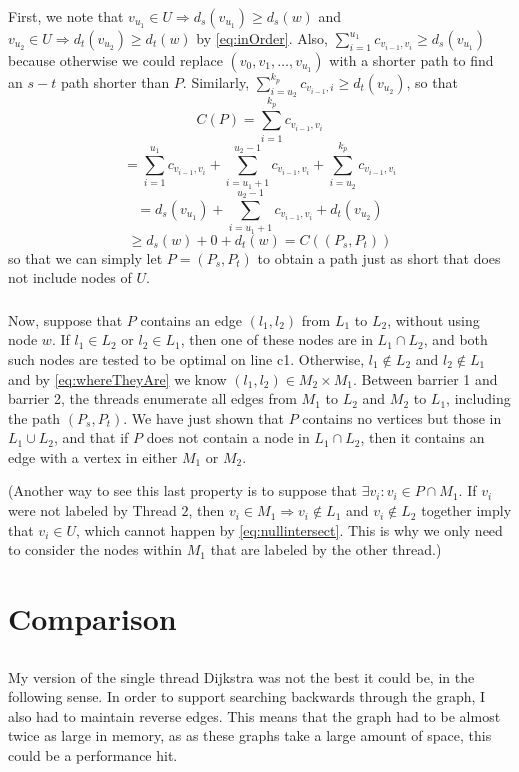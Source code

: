 \documentclass{article}
\begin{document}
First, we note that $v_{u_1} \in U \Rightarrow d_s(v_{u_1}) \ge d_s(w)$ and $v_{u_2} \in U \Rightarrow d_t(v_{u_2}) \ge d_t(w)$ by \ref{eq:inOrder}.
Also, $\sum_{i=1}^{u_1} c_{v_{i-1},v_i} \ge d_s(v_{u_1})$ because otherwise we could replace $(v_0, v_1, \ldots, v_{u_1})$
with a shorter path to find an $s-t$ path shorter than $P$.
Similarly, $\sum_{i=u_2}^{k_p} c_{v_{i-1},i} \ge d_t(v_{u_2})$, so that
$$C(P) = \sum_{i=1}^{k_p} c_{v_{i-1},v_i} $$
$$ = \sum_{i=1}^{u_1} c_{v_{i-1},v_i} + \sum_{i=u_1+1}^{{u_2}-1} c_{v_{i-1},v_i} + \sum_{i=u_2}^{k_p} c_{v_{i-1},v_i} $$
$$ = d_s(v_{u_1}) + \sum_{i=u_1+1}^{{u_2}-1} c_{v_{i-1},v_i} + d_t(v_{u_2})$$
$$ \ge d_s(w) + 0 + d_t(w) = C( (P_s, P_t) )$$
so that we can simply let $P = (P_s, P_t)$ to obtain a path just as short that does not include nodes of $U$.

\subsubsection{}
Now, suppose that $P$ contains an edge $(l_1,l_2)$ from $L_1$ to $L_2$, without using node $w$.
If $l_1 \in L_2$ or $l_2 \in L_1$, then one of these nodes are in $L_1 \cap L_2$, and both such nodes are tested to be optimal on line c1.
Otherwise, $l_1 \not \in L_2$ and $l_2 \not \in L_1$ and by \ref{eq:whereTheyAre} we know $(l_1, l_2) \in M_2 \times M_1$.
Between barrier 1 and barrier 2, the threads enumerate all edges from $M_1$ to $L_2$ and $M_2$ to $L_1$, including the path $(P_s, P_t)$.
We have just shown that $P$ contains no vertices but those in $L_1 \cup L_2$, and that if $P$ does not contain a node in $L_1 \cap L_2$,
then it contains an edge with a vertex in either $M_1$ or $M_2$.

(Another way to see this last property is to suppose that $\exists v_i : v_i \in P \cap M_1$.
If $v_i$ were not labeled by Thread $2$, then $v_i \in M_1 \Rightarrow v_i \not \in L_1$ and $v_i \not \in L_2$
together imply that $v_i \in U$, which cannot happen by \ref{eq:nullintersect}.
This is why we only need to consider the nodes within $M_1$ that are labeled by the other thread.)

\section{Comparison}
\subsection{}
My version of the single thread Dijkstra was not the best it could be, in the following sense.
In order to support searching backwards through the graph, I also had to maintain reverse edges.
This means that the graph had to be almost twice as large in memory, as as these graphs take a large amount of space, this could be a performance hit.
\end{document}
